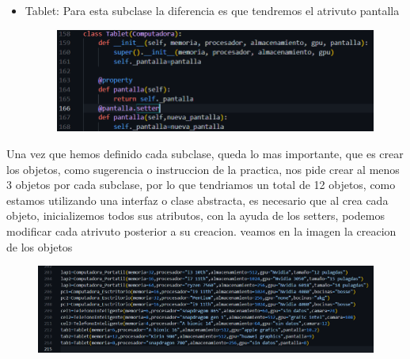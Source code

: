 \documentclass[12pt]{article}
\begin{document}
\begin{itemize}
\begin{figure}[H]
\begin{center}
		\end{center} 
\end{figure}

\item Tablet: Para esta subclase la diferencia es que tendremos el atrivuto pantalla
\begin{figure}[H]
		\begin{center}
 			\includegraphics[width = .6\textwidth]{06.png}
 			 	
		\end{center} 
\end{figure}

\end{itemize}

Una vez que hemos definido cada subclase, queda lo mas importante, que es crear los objetos, como sugerencia o instruccion de la practica, nos pide crear al menos 3 objetos por cada subclase, por lo que tendriamos un total de 12 objetos, como estamos utilizando una interfaz o clase abstracta, es necesario que al crea cada objeto, inicializemos todos sus atributos, con la ayuda de los setters, podemos modificar cada atrivuto posterior a su creacion. veamos en la imagen la creacion de  los objetos 
\begin{figure}[H]
		\begin{center}
 			\includegraphics[width = .8\textwidth]{07.png}
 			 	
		\end{center} 
\end{figure}
\end{document}
